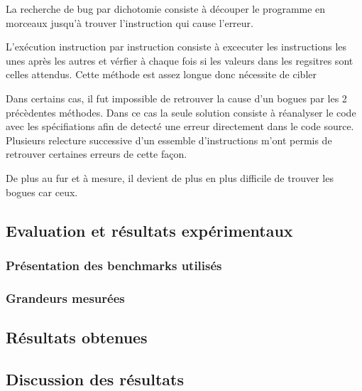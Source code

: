 La recherche de bug par dichotomie consiste à découper le programme en morceaux jusqu'à trouver l'instruction qui cause l'erreur.

L'exécution instruction par instruction consiste à excecuter les instructions les unes après les autres et vérfier à chaque fois si les valeurs dans les regsitres
sont celles attendus. Cette méthode est assez longue donc nécessite de cibler 

Dans certains cas, il fut impossible de retrouver la cause d'un bogues par les 2 précèdentes méthodes. 
Dans ce cas la seule solution consiste à réanalyser le code avec les spécifiations afin de detecté une erreur directement dans le code source.
Plusieurs relecture successive d'un essemble d'instructions m'ont permis de retrouver certaines erreurs de cette façon.

De plus au fur et à mesure, il devient de plus en plus difficile de trouver les bogues car ceux. 

\subsection{Evaluation et résultats expérimentaux}

\subsubsection{Présentation des benchmarks utilisés}
\subsubsection{Grandeurs mesurées}

\subsection{Résultats obtenues}

\subsection{Discussion des résultats}